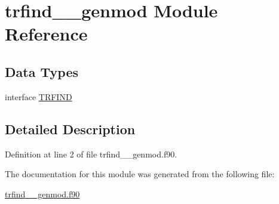 \hypertarget{classtrfind____genmod}{\section{trfind\+\_\+\+\_\+genmod Module Reference}
\label{classtrfind____genmod}
}
\subsection*{Data Types}
\begin{DoxyCompactItemize}
\item 
interface \hyperlink{interfacetrfind____genmod_1_1TRFIND}{T\+R\+F\+I\+N\+D}
\end{DoxyCompactItemize}


\subsection{Detailed Description}


Definition at line 2 of file trfind\+\_\+\+\_\+genmod.\+f90.



The documentation for this module was generated from the following file\+:\begin{DoxyCompactItemize}
\item 
\hyperlink{trfind____genmod_8f90}{trfind\+\_\+\+\_\+genmod.\+f90}\end{DoxyCompactItemize}

